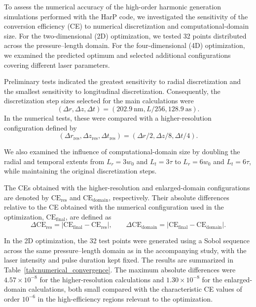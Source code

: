 \documentclass[11pt,a4paper]{article}
\newcommand{\CE}{\ensuremath{\mathrm{CE}}}
\begin{document}
To assess the numerical accuracy of the high-order harmonic generation simulations performed with the HarP code, we investigated the sensitivity of the conversion efficiency (CE) to numerical discretization and computational-domain size. For the two-dimensional (2D) optimization, we tested 32 points distributed across the pressure--length domain. For the four-dimensional (4D) optimization, we examined the predicted optimum and selected additional configurations covering different laser parameters.

Preliminary tests indicated the greatest sensitivity to radial discretization and the smallest sensitivity to longitudinal discretization. Consequently, the discretization step sizes selected for the main calculations were
\begin{equation}
(\Delta r,\Delta z,\Delta t)=(202.9~\mathrm{nm},L/256,128.9~\mathrm{as}).
\end{equation}
In the numerical tests, these were compared with a higher-resolution configuration defined by
\begin{equation}
(\Delta r_{\mathrm{res}},\Delta z_{\mathrm{res}},\Delta t_{\mathrm{res}})
=(\Delta r/2,\Delta z/8,\Delta t/4).
\end{equation}

We also examined the influence of computational-domain size by doubling the radial and temporal extents from $L_r=3w_0$ and $L_t=3\tau$ to $L_r=6w_0$ and $L_t=6\tau$, while maintaining the original discretization steps.

The CEs obtained with the higher-resolution and enlarged-domain configurations are denoted by $\CE_{\mathrm{res}}$ and $\CE_{\mathrm{domain}}$, respectively. Their absolute differences relative to the CE obtained with the numerical configuration used in the optimization, $\CE_{\mathrm{final}}$, are defined as
\begin{equation}
\Delta\CE_{\mathrm{res}}=|\CE_{\mathrm{final}}-\CE_{\mathrm{res}}|,
\qquad
\Delta\CE_{\mathrm{domain}}=|\CE_{\mathrm{final}}-\CE_{\mathrm{domain}}|.
\end{equation}

In the 2D optimization, the 32 test points were generated using a Sobol sequence across the same pressure--length domain as in the accompanying study, with the laser intensity and pulse duration kept fixed. The results are summarized in Table~\ref{tab:numerical_convergence}. The maximum absolute differences were $4.57\times10^{-8}$ for the higher-resolution calculations and $1.30\times10^{-8}$ for the enlarged-domain calculations, both small compared with the characteristic CE values of order $10^{-6}$ in the high-efficiency regions relevant to the optimization.
\end{document}
